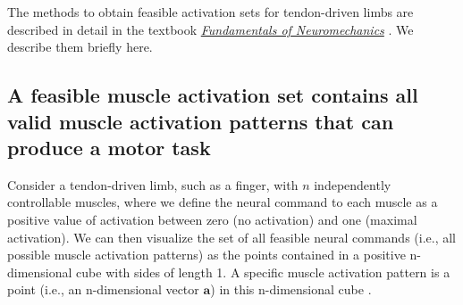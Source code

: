 \documentclass[10pt,letterpaper]{article}
\begin{document}
The methods to obtain feasible activation sets for tendon-driven limbs are described in detail in the textbook \underline{\emph{Fundamentals of Neuromechanics}} \cite{valero-cuevas2015fundamentals}. We describe them briefly here.
\label{s:methods}
\subsection*{A feasible muscle activation set contains all valid muscle activation patterns that can produce a motor  task}

Consider a tendon-driven limb, such as a finger, with $n$ independently controllable muscles, where we define the neural command to each muscle as a positive value of activation between zero (no activation) and one (maximal activation).
We can then visualize the set of all feasible neural commands (i.e., all possible muscle activation patterns) as the points contained in a positive n-dimensional cube with sides of length 1.  A specific muscle activation pattern is a point (i.e., an n-dimensional vector $\textbf{a}$) in this n-dimensional cube  \cite{Chao1978Graphical, spoor1983balancing, Kuo1993Human, Valero-Cuevas1998Large}.
\end{document}
